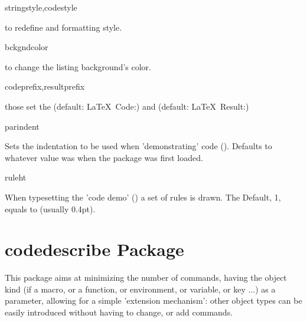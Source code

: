 \documentclass{article}
\begin{document}
\begin{codedescribe}[key]{stringstyle,codestyle}
\begin{codesyntax} %
\end{codesyntax}
to redefine  and  formatting style.\\
\end{codedescribe}

\begin{codedescribe}[key]{bckgndcolor}
\begin{codesyntax} %
\end{codesyntax}
to change the listing background's color.\\
\end{codedescribe}

\begin{codedescribe}[key]{codeprefix,resultprefix}
\begin{codesyntax} %
\end{codesyntax}
those set the  (default: \LaTeX~Code:) and  (default: \LaTeX~Result:)
\end{codedescribe}

\begin{codedescribe}[key]{parindent}
\begin{codesyntax} %
\end{codesyntax}
Sets the indentation to be used when 'demonstrating' \LaTeXe code (\tsobj[code]{\tsdemo}). Defaults to whatever value \tsobj[code]{\parindent} was when the package was first loaded.
\end{codedescribe}

\begin{codedescribe}[key]{ruleht}
\begin{codesyntax} %
\end{codesyntax}
When typesetting the 'code demo' (\tsobj{\tsdemo}) a set of rules is drawn. The Default, 1, equals to \tsobj{\arrayrulewidth} (usually 0.4pt).
\end{codedescribe}



\section{codedescribe Package}

This package aims at minimizing the number of commands, having the object kind (if a macro, or a function, or environment, or variable, or key ...) as a parameter, allowing for a simple 'extension mechanism': other object types can be easily introduced without having to change, or add commands.
\end{document}
